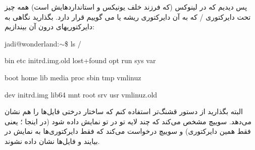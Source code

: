پس دیدیم که در لینوکس (که فرزند خلف یونیکس و استانداردهایش است) همه چیز تحت دایرکتوری / که به آن دایرکتوری ریشه یا 
 می گوییم قرار دارد. بگذارید نگاهی به دایرکتوریهای درون آن بیندازیم:
\begin{latin}
\begin{mybox}
jadi@wonderland:$\sim$\$ ls /

bin etc initrd.img.old lost+found opt run sys var

boot home lib media proc sbin tmp vmlinuz

dev initrd.img lib64 mnt root srv usr vmlinuz.old

\end{mybox}
\end{latin}
البته بگذارید از دستور قشنگ‌تر 
 استفاده کنم که ساختار درختی فایل‌ها را هم نشان می‌دهد. سوییچ
   مشخص می‌کند که چند لایه تو در تو نمایش داده شود (در اینجا
   ؛ یعنی فقط همین دایرکتوری) و سوییچ
   درخواست می‌کند که فقط دایرکتوری‌ها به نمایش در بیایند و فایل‌ها نشان داده نشوند.
